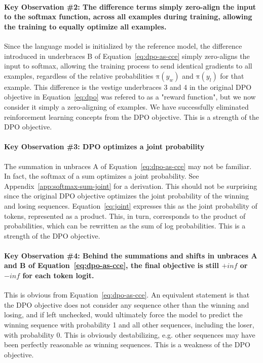 \documentclass[twoside,11pt]{article}
\begin{document}
\paragraph{Key Observation \#2: The difference terms simply zero-align
the input to the softmax function, across all examples during training,
allowing the training to equally optimize all examples.} 
Since
the language model is initialized by the reference model,
the difference introduced in underbraces B of Equation~\ref{eq:dpo-as-cce}
simply zero-aligns
the input to softmax, allowing the training process to send identical
gradients to all examples, regardless of the relative probabilities
$\mathrm{\pi}(y_w)$ and $\mathrm{\pi}(y_l)$ for that example. 
This difference is the
vestige underbraces 3 and 4 in the original DPO objective in Equation~\ref{eq:dpo}
was refered to as a "reward function", 
but we now consider it simply a zero-aligning of examples. We have
successfully eliminated reinforcement learning concepts from the DPO objective. 
This is a strength of the DPO objective. 

\paragraph{Key Observation \#3: DPO optimizes a joint probability}
The summation in unbraces A of Equation~\ref{eq:dpo-as-cce}
may not be familiar. In fact, the softmax of a sum optimizes a joint probability.
See Appendix~\ref{app:softmax-sum-joint}
for a derivation. 
This should not be surprising since the original DPO objective 
optimizes the joint probability of the winning and losing sequences. 
Equation~\ref{eq:joint} expresses this as the joint probability of 
tokens, represented as a product. This, in turn, corresponds to the 
product of probabilities, which can be rewritten as the sum of log probabilities.
This is a strength of the DPO objective. 

\paragraph{Key Observation \#4: Behind the summations and shifts
in unbraces A and B of Equation~\ref{eq:dpo-as-cce}, 
the final objective is still $+inf$ or $-inf$ for each token logit.} 
This
is obvious from Equation~\ref{eq:dpo-as-cce}. An equivalent statement is that
the DPO objective does not consider any sequence other than the
winning and losing, and if left unchecked, would ultimately force
the model to predict the winning sequence with probability 1 and all
other sequences, including the loser, with probability 0. This is obviously
destabilizing, e.g. other sequences may have been perfectly
reasonable as winning sequences. This is a weakness
of the DPO objective. 
\end{document}
